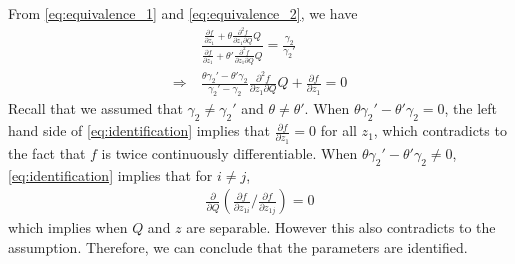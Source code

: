 \documentclass[11pt, a4paper]{article}
\begin{document}
From \eqref{eq:equivalence_1} and \eqref{eq:equivalence_2}, we have
\begin{align}\label{eq:identification}
    &\frac{\frac{\partial f}{\partial z_1} + \theta \frac{\partial^2 f}{\partial z_1\partial Q}Q}{\frac{\partial f}{\partial z_1} + \theta' \frac{\partial^2 f}{\partial z_1\partial Q}Q} = \frac{\gamma_2}{\gamma_2'}\nonumber\\
    \Longrightarrow\ & \frac{\theta \gamma_2' - \theta' \gamma_2}{\gamma_2' - \gamma_2}\frac{\partial^2 f}{\partial z_1\partial Q}Q  +    \frac{\partial f}{\partial z_1} = 0
\end{align}
Recall that we assumed that $\gamma_2\ne \gamma_2'$ and $\theta\ne \theta'$. When $ \theta \gamma_2' - \theta' \gamma_2 = 0$, the left hand side of \eqref{eq:identification} implies that $\frac{\partial f}{\partial z_1} = 0$ for all $z_1$, which contradicts to the fact that $f$ is twice continuously differentiable. When  $ \theta \gamma_2' - \theta' \gamma_2 \ne 0$, \eqref{eq:identification} implies that for $i \ne j$, 
\begin{align}
    \frac{\partial }{\partial Q}\left( {\frac{\partial f}{\partial z_{1i}}}/{\frac{\partial f}{\partial z_{1j}}}    \right) = 0
\end{align}
which implies when $Q$ and $z$ are separable. However this also contradicts to the assumption.
Therefore, we can conclude that the parameters are identified.







\end{document}
